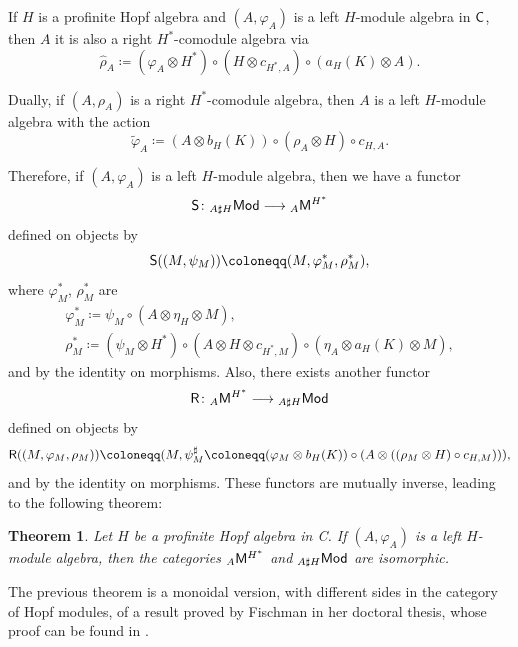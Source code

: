 \documentclass[11pt,reqno]{amsart}
\theoremstyle{plain}%
\newtheorem{theorem}{Theorem}[section]%
\theoremstyle{definition}
\theoremstyle{remark}
\begin{document}
If $H$ is a profinite Hopf algebra and $(A, \varphi_{A})$ is a left $H$-module algebra in ${\sf C}$, then $A$ it is also a right $H^{\ast}$-comodule algebra via 
$$\widehat{\rho}_{A}\coloneqq(\varphi_{A}\otimes H^{\ast})\circ (H\otimes c_{H^{\ast},A})\circ (a_{H}(K)\otimes A).$$

Dually, if   $(A, \rho_{A})$ is a  right $H^{\ast}$-comodule algebra, then $A$ is a  left $H$-module algebra with the action 
$$\widetilde{\varphi}_{A}\coloneqq(A\otimes b_{H}(K))\circ (\rho_{A}\otimes H)\circ c_{H,A}.$$

Therefore, if $(A, \varphi_{A})$ is a left $H$-module algebra, then we have a functor 
$${\sf S}\colon {}_{A \sharp H}{\sf Mod}\longrightarrow {}_{A}{\sf M}^{H^{\ast}}$$
defined on objects by 
$${\sf S}((M, \psi_{M}))\coloneqq(M, \varphi_{M}^{\ast}, \rho_{M}^{\ast}),$$
where $\varphi_{M}^{\ast}$, $\rho_{M}^{\ast}$ are 
\begin{gather*}
	\varphi_{M}^{\ast}\coloneqq\psi_{M}\circ (A\otimes \eta_{H}\otimes M),\\
	\rho_{M}^{\ast}\coloneqq(\psi_{M}\otimes H^{\ast})\circ (A\otimes H\otimes c_{H^{\ast},M} )\circ (\eta_{A}\otimes a_{H}(K)\otimes M),
\end{gather*}
and by the identity on morphisms. Also, there exists  another functor 
$${\sf R}\colon {}_{A}{\sf M}^{H^{\ast}}  \longrightarrow {}_{A\sharp H}{\sf Mod}$$
defined on objects by 
$${\sf R}((M, \varphi_{M},\rho_{M}))\coloneqq(M, \psi_{M}^{\sharp}\coloneqq(\varphi_{M}\otimes b_{H}(K))\circ (A\otimes ((\rho_{M}\otimes H)\circ c_{H,M}))),$$
and by the identity on morphisms.  These functors are mutually inverse, leading to the following theorem: 

\begin{theorem}
	\label{smash} Let $H$ be a profinite Hopf algebra in {\sf C}. If $(A, \varphi_{A})$ is  a left $H$-module algebra, then the categories 
	${}_{A}{\sf M}^{H^{\ast}}$ and ${}_{A \sharp H}{\sf Mod}$ are isomorphic. 
\end{theorem}

The previous theorem is a monoidal version, with different sides in the category of Hopf modules, of a result proved by Fischman in her doctoral thesis, whose proof can be found in \cite[Proposition 1.6]{CFM}.
\end{document}
